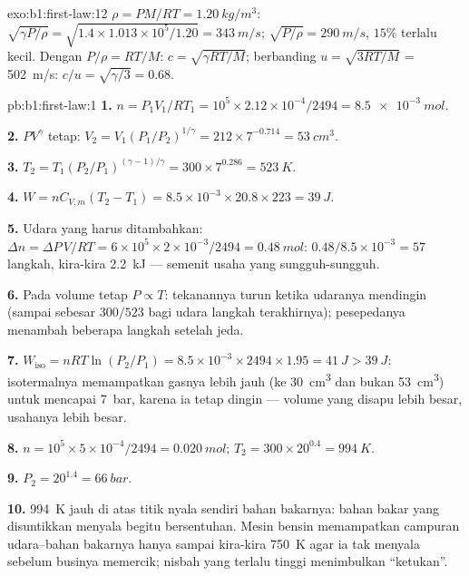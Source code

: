 \begin{solution}{exo:b1:first-law:12}
$\rho = PM/RT = \qty{1.20}{kg/m^3}$: $\sqrt{\gamma P/\rho} = \sqrt{1.4 \times
1.013\times10^5/1.20} = \qty{343}{m/s}$; $\sqrt{P/\rho} = \qty{290}{m/s}$, $15\%$
terlalu kecil. Dengan $P/\rho = RT/M$: $c = \sqrt{\gamma RT/M}$; berbanding $u = \sqrt{3RT/M}$
= \qty{502}{m/s}: $c/u = \sqrt{\gamma/3} = 0.68$.
\end{solution}

\begin{solution}{pb:b1:first-law:1}
\textbf{1.} $n = P_1V_1/RT_1 = 10^5 \times 2.12\times10^{-4}/2494 = \qty{8.5e-3}{mol}$.

\textbf{2.} $PV^\gamma$ tetap: $V_2 = V_1(P_1/P_2)^{1/\gamma} = 212 \times
7^{-0.714} = \qty{53}{cm^3}$.

\textbf{3.} $T_2 = T_1(P_2/P_1)^{(\gamma - 1)/\gamma} = 300 \times 7^{0.286} =
\qty{523}{K}$.

\textbf{4.} $W = nC_{V,m}(T_2 - T_1) = 8.5\times10^{-3} \times 20.8 \times 223 =
\qty{39}{J}$.

\textbf{5.} Udara yang harus ditambahkan: $\Delta n = \Delta P\,V/RT = 6\times10^5 \times 2\times10^{-3}/
2494 = \qty{0.48}{mol}$: $0.48/8.5\times10^{-3} = 57$ langkah, kira-kira
\qty{2.2}{kJ} --- semenit usaha yang sungguh-sungguh.

\textbf{6.} Pada volume tetap $P \propto T$: tekanannya turun ketika udaranya
mendingin (sampai sebesar $300/523$ bagi udara langkah terakhirnya); pesepedanya menambah
beberapa langkah setelah jeda.

\textbf{7.} $W_{\text{iso}} = nRT\ln(P_2/P_1) = 8.5\times10^{-3} \times 2494 \times
1.95 = \qty{41}{J} > \qty{39}{J}$:  isotermalnya memampatkan gasnya
lebih jauh (ke \qty{30}{cm^3} dan bukan \qty{53}{cm^3}) untuk mencapai \qty{7}{bar},
karena ia tetap dingin --- volume yang disapu lebih besar, usahanya lebih besar.

\textbf{8.} $n = 10^5 \times 5\times10^{-4}/2494 = \qty{0.020}{mol}$; $T_2 =
300 \times 20^{0.4} = \qty{994}{K}$.

\textbf{9.} $P_2 = 20^{1.4} = \qty{66}{bar}$.

\textbf{10.} \qty{994}{K} jauh di atas titik nyala sendiri bahan bakarnya:
bahan bakar yang disuntikkan menyala begitu bersentuhan. Mesin bensin memampatkan
campuran udara--bahan bakarnya hanya sampai kira-kira \qty{750}{K} agar ia tak menyala
sebelum businya memercik; nisbah yang terlalu tinggi menimbulkan ``ketukan''.


\end{solution}
